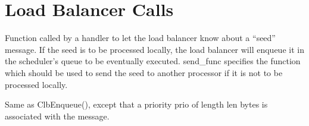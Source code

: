 
\section{Load Balancer Calls}


Function called by a handler to let the load balancer know about a
``seed'' message. If the seed is to be processed locally, the
load balancer will
enqueue it in the scheduler's queue to be eventually executed.
{\sf send\_func} specifies the function
which should be used to send the seed to another processor
if it is not to be processed locally.

Same as {\sf ClbEnqueue()}, except that a priority {\sf prio} of length
{\sf len} bytes is associated with the message.



